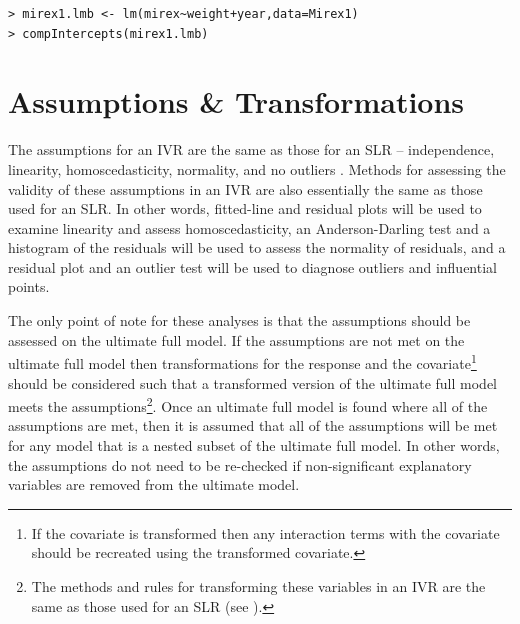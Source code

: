 \documentclass[10pt,openany]{book}\usepackage[]{graphicx}\usepackage[]{color}
\makeatletter
\newenvironment{kframe}{%
 \def\at@end@of@kframe{}%
 \ifinner\ifhmode%
  \def\at@end@of@kframe{\end{minipage}}%
  \begin{minipage}{\columnwidth}%
 \fi\fi%
 \def\FrameCommand##1{\hskip\@totalleftmargin \hskip-\fboxsep
 \colorbox{shadecolor}{##1}\hskip-\fboxsep
     \hskip-\linewidth \hskip-\@totalleftmargin \hskip\columnwidth}%
 \MakeFramed {\advance\hsize-\width
   \@totalleftmargin\z@ \linewidth\hsize
   \@setminipage}}%
 {\par\unskip\endMakeFramed%
 \at@end@of@kframe}
\newenvironment{knitrout}{}{} %
\makeatother
\begin{document}
\begin{knitrout}
\color{fgcolor}\begin{kframe}
\begin{verbatim}
> mirex1.lmb <- lm(mirex~weight+year,data=Mirex1)
> compIntercepts(mirex1.lmb)
\end{verbatim}
\end{kframe}
\end{knitrout}


\section{Assumptions \& Transformations}
The assumptions for an IVR are the same as those for an SLR -- independence, linearity, homoscedasticity, normality, and no outliers .  Methods for assessing the validity of these assumptions in an IVR are also essentially the same as those used for an SLR.  In other words, fitted-line and residual plots will be used to examine linearity and assess homoscedasticity, an Anderson-Darling test and a histogram of the residuals will be used to assess the normality of residuals, and a residual plot and an outlier test will be used to diagnose outliers and influential points.


\vspace{-12pt}

The only point of note for these analyses is that the assumptions should be assessed on the ultimate full model.  If the assumptions are not met on the ultimate full model then transformations for the response and the covariate\footnote{If the covariate is transformed then any interaction terms with the covariate should be recreated using the transformed covariate.} should be considered such that a transformed version of the ultimate full model meets the assumptions\footnote{The methods and rules for transforming these variables in an IVR are the same as those used for an SLR (see ).}.  Once an ultimate full model is found where all of the assumptions are met, then it is assumed that all of the assumptions will be met for any model that is a nested subset of the ultimate full model.  In other words, the assumptions do not need to be re-checked if non-significant explanatory variables are removed from the ultimate model.
\end{document}
